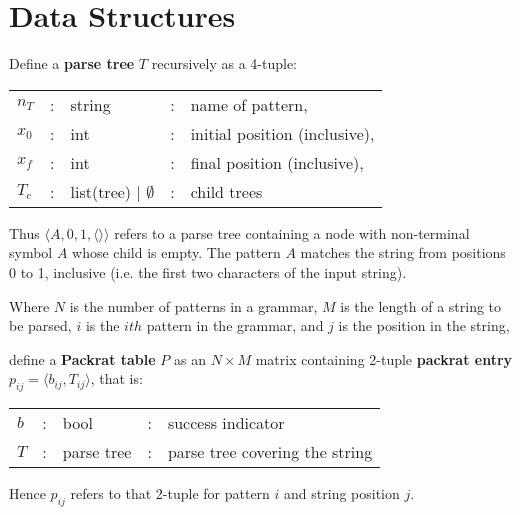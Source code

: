 \section{Data Structures}

\begin{framed} 

Define a \textbf{parse tree} $T$ recursively as a 4-tuple:

  \begin{center}
   \begin{tabular}{lclcl}
    $n_T$ & : & string                        & : & name of pattern,              \\
    $x_0$ & : & int                           & : & initial position (inclusive), \\
    $x_f$ & : & int                           & : & final position (inclusive),   \\
    $T_c$ & : & list(tree) $\mid$ $\emptyset$ & : & child trees                   \\
   \end{tabular}
  \end{center}

Thus $\langle A, 0, 1, \langle \rangle \rangle$ refers to a parse tree
containing a node with non-terminal symbol $A$ whose child is empty. The
pattern $A$ matches the string from positions 0 to 1, inclusive (i.e. the first
two characters of the input string).

 \end{framed}

\begin{framed} 

Where $N$ is the number of patterns in a grammar, $M$ is the length of a string
to be parsed, $i$ is the $ith$ pattern in the grammar, and $j$ is the position
in the string, 

\vspace{12pt} 

define a \textbf{Packrat table} $P$ as an $N \times M$  matrix containing
2-tuple \textbf{packrat entry} $p_{ij} = \langle b_{ij}, T_{ij} \rangle$, that
is: 

  \begin{center}
   \begin{tabular}{lclcl}
    $b$ & : & bool       & : & success indicator              \\
    $T$ & : & parse tree & : & parse tree covering the string \\
   \end{tabular}
  \end{center}

Hence $p_{ij}$ refers to that 2-tuple for pattern $i$ and string position $j$.

 \end{framed}

